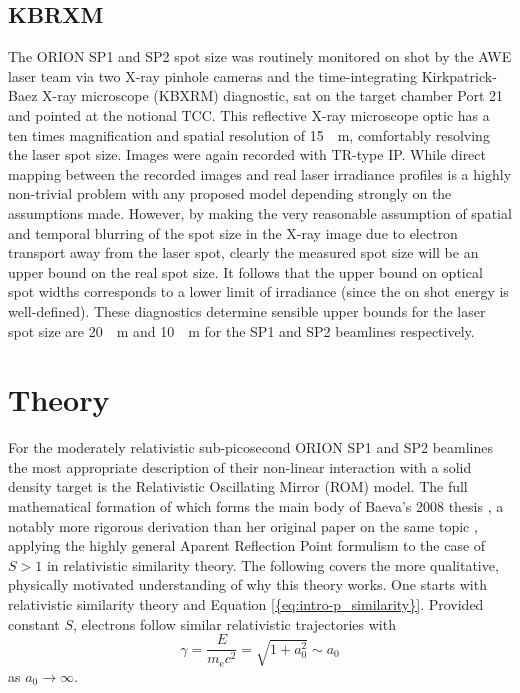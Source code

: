 \subsection{KBRXM}
The ORION SP1 and SP2 spot size was routinely monitored on shot by the AWE laser team via two X-ray pinhole cameras and the time-integrating Kirkpatrick-Baez X-ray microscope (KBXRM) diagnostic, sat on the target chamber Port 21 and pointed at the notional \ac{TCC}. This reflective X-ray microscope optic has a ten times magnification and spatial resolution of \qty{15}{\mu m}, comfortably resolving the laser spot size. Images were again recorded with TR-type IP. While direct mapping between the recorded images and real laser irradiance profiles is a highly non-trivial problem with any proposed model depending strongly on the assumptions made. However, by making the very reasonable assumption of spatial and temporal blurring of the spot size in the X-ray image due to electron transport away from the laser spot, clearly the measured spot size will be an upper bound on the real spot size. It follows that the upper bound on optical spot widths corresponds to a lower limit of irradiance (since the on shot energy is well-defined). These diagnostics determine sensible upper bounds for the laser spot size are \qty{20}{\mu m} and \qty{10}{\mu m} for the SP1 and SP2 beamlines respectively.

\section{\label{ch:3-sec:theory}Theory}
For the moderately relativistic sub-picosecond ORION SP1 and SP2 beamlines the most appropriate description of their non-linear interaction with a solid density target is the Relativistic Oscillating Mirror (ROM) model. The full mathematical formation of which forms the main body of Baeva's 2008 thesis \cite{baevaHighHarmonicGeneration2008}, a notably more rigorous derivation than her original paper on the same topic \cite{baevaTheoryHighorderHarmonic2006}, applying the highly general Aparent Reflection Point formulism to the case of $S>1$ in relativistic similarity theory. The following covers the more qualitative, physically motivated understanding of why this theory works. One starts with relativistic similarity theory and Equation \ref{{eq:intro-p_similarity}}. Provided constant $S$, electrons follow similar relativistic trajectories with 
\begin{equation}
	\gamma = \frac{E}{m_\mathrm{e}c^2}  = \sqrt{1+a_0^2} \sim a_0
\end{equation}
as $a_0 \to \infty$. 



